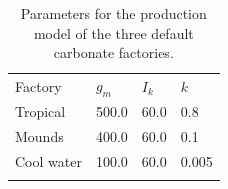 
\begin{table}[t]
\caption{Parameters for the production model of the three default
carbonate factories.}\label{tbl:factories}
    \begin{tabular}{llll}
\tophline %
        Factory & $g_m$ & $I_k$ & $k$ \\
\middlehline %
Tropical & 500.0 & 60.0 & 0.8 \\
Mounds & 400.0 & 60.0 & 0.1 \\
Cool water & 100.0 & 60.0 & 0.005 \\
\bottomhline %
    \end{tabular}
\end{table}
